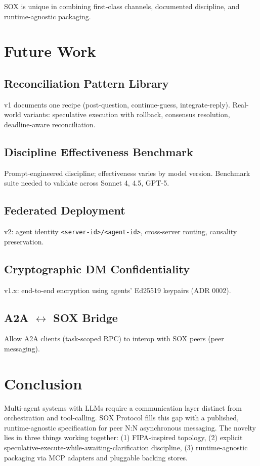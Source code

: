 \documentclass[11pt]{article}
\begin{document}
SOX is unique in combining first-class channels, documented discipline, and runtime-agnostic packaging.

\section{Future Work}

\subsection{Reconciliation Pattern Library}

v1 documents one recipe (post-question, continue-guess, integrate-reply). Real-world variants: speculative execution with rollback, consensus resolution, deadline-aware reconciliation.

\subsection{Discipline Effectiveness Benchmark}

Prompt-engineered discipline; effectiveness varies by model version. Benchmark suite needed to validate across Sonnet 4, 4.5, GPT-5.

\subsection{Federated Deployment}

v2: agent identity \texttt{<server-id>/<agent-id>}, cross-server routing, causality preservation.

\subsection{Cryptographic DM Confidentiality}

v1.x: end-to-end encryption using agents' Ed25519 keypairs (ADR 0002).

\subsection{A2A $\leftrightarrow$ SOX Bridge}

Allow A2A clients (task-scoped RPC) to interop with SOX peers (peer messaging).

\section{Conclusion}

Multi-agent systems with LLMs require a communication layer distinct from orchestration and tool-calling. SOX Protocol fills this gap with a published, runtime-agnostic specification for peer N:N asynchronous messaging. The novelty lies in three things working together: (1) FIPA-inspired topology, (2) explicit speculative-execute-while-awaiting-clarification discipline, (3) runtime-agnostic packaging via MCP adapters and pluggable backing stores.
\end{document}
